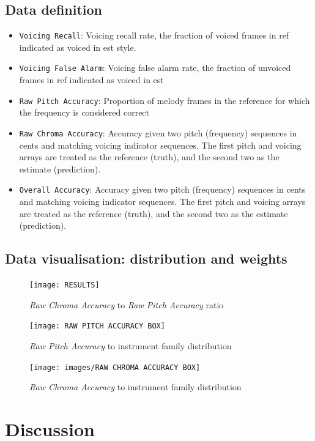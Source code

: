 \documentclass{article}
\begin{document}
\subsection{Data definition}
\begin{itemize}
\item {\verb|Voicing Recall|}: Voicing recall rate, the fraction of voiced frames in ref indicated as voiced in est style.
\item{\verb|Voicing False Alarm|}: Voicing false alarm rate, the fraction of unvoiced frames in ref indicated as voiced in est
\item{\verb|Raw Pitch Accuracy|}: Proportion of melody frames in the reference for which the frequency is considered correct
\item{\verb|Raw Chroma Accuracy|}: Accuracy given two pitch (frequency) sequences in cents and matching voicing indicator sequences. The first pitch and voicing arrays are treated as the reference (truth), and the second two as the estimate (prediction).
\item{\verb|Overall Accuracy|}: Accuracy given two pitch (frequency) sequences in cents and matching voicing indicator sequences. The first pitch and voicing arrays are treated as the reference (truth), and the second two as the estimate (prediction).
\end{itemize}

\subsection{Data visualisation: distribution and weights}
\begin{figure}[H]
\centering
\texttt{[image: RESULTS]}
\caption{\textit{Raw Chroma Accuracy} to \textit{Raw Pitch Accuracy} ratio}
\end{figure}

\begin{figure}[H]
\centering
\texttt{[image: RAW PITCH ACCURACY BOX]}
\caption{\textit{Raw Pitch Accuracy} to instrument family distribution}
\end{figure}

\begin{figure}[H]
\centering
\texttt{[image: images/RAW CHROMA ACCURACY BOX]}
\caption{\textit{Raw Chroma Accuracy} to instrument family distribution}
\end{figure}

\section{Discussion}
\end{document}
